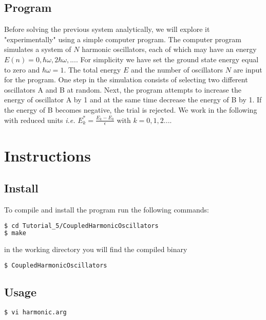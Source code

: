 \documentclass[10pt]{article}
\begin{document}
\subsection{Program}

Before solving the previous system analytically, we will explore it "experimentally" using a simple computer program. The computer program simulates a system of $N$ harmonic oscillators, each of which may have an energy $ E(n)=0,\hbar\omega,2\hbar\omega,...$. For simplicity we have set the ground state energy equal to zero and $\hbar\omega = 1 $. The total energy $E$
and the number of oscillators $N$ are input for the program. One step in the simulation consists of selecting two different oscillators A and B at random. Next, the program attempts to increase the energy of oscillator A by 1 and at the same time decrease the energy of B by 1. If the energy of B becomes negative, the trial is rejected. We work in the following with reduced units \emph{i.e.} $E_k^* = \frac{E_k - E_0}{\epsilon}$ with $k =0,1,2....$



\section{Instructions}

\subsection{Install}

To compile and install the program run the following commands:

\begin{lstlisting}[language=bash]
$ cd Tutorial_5/CoupledHarmonicOscillators
$ make
\end{lstlisting} 
%
in the working directory you will find the compiled binary 

\begin{lstlisting}[language=bash]
$ CoupledHarmonicOscillators
\end{lstlisting} 


\subsection{Usage}



\begin{lstlisting}[language=bash]
$ vi harmonic.arg
\end{lstlisting} 
\end{document}
